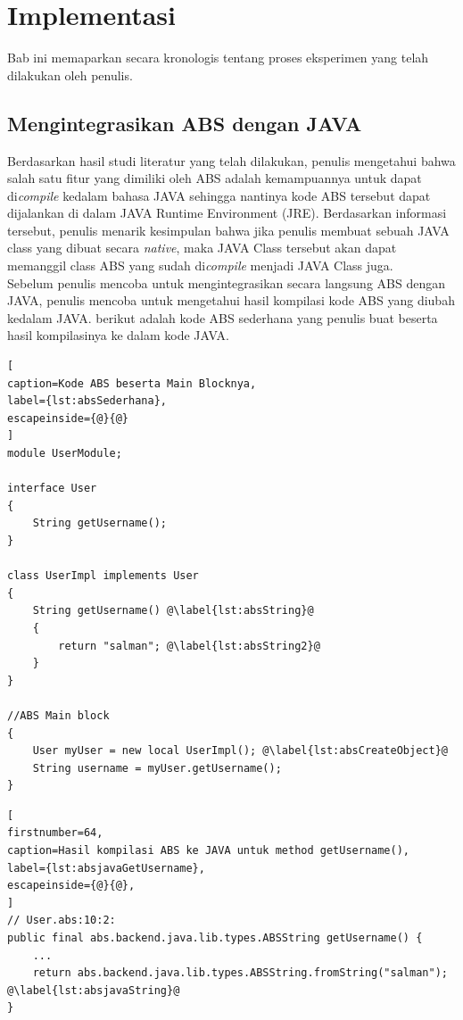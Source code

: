 \chapter{Implementasi}
Bab ini memaparkan secara kronologis tentang proses eksperimen yang telah dilakukan oleh penulis.

\section{Mengintegrasikan ABS dengan JAVA}
Berdasarkan hasil studi literatur yang telah dilakukan, penulis mengetahui bahwa salah satu fitur yang dimiliki oleh ABS adalah kemampuannya untuk dapat di\textit{compile} kedalam bahasa JAVA sehingga nantinya kode ABS tersebut dapat dijalankan di dalam JAVA Runtime Environment (JRE). Berdasarkan informasi tersebut, penulis menarik kesimpulan bahwa jika penulis membuat sebuah JAVA class yang dibuat secara \textit{native}, maka JAVA Class tersebut akan dapat memanggil class ABS yang sudah di\textit{compile} menjadi JAVA Class juga.\\

Sebelum penulis mencoba untuk mengintegrasikan secara langsung ABS dengan JAVA, penulis mencoba untuk mengetahui hasil kompilasi kode ABS yang diubah kedalam JAVA. berikut adalah kode ABS sederhana yang penulis buat beserta hasil kompilasinya ke dalam kode JAVA.

\begin{lstlisting}[
caption=Kode ABS beserta Main Blocknya,
label={lst:absSederhana},
escapeinside={@}{@}
]
module UserModule;

interface User
{
	String getUsername();
}

class UserImpl implements User
{
	String getUsername() @\label{lst:absString}@
	{
		return "salman"; @\label{lst:absString2}@
	}
}

//ABS Main block
{
	User myUser = new local UserImpl(); @\label{lst:absCreateObject}@
	String username = myUser.getUsername();
}
\end{lstlisting}

\begin{lstlisting}[ 
firstnumber=64,
caption=Hasil kompilasi ABS ke JAVA untuk method getUsername(),
label={lst:absjavaGetUsername},
escapeinside={@}{@},
]
// User.abs:10:2: 
public final abs.backend.java.lib.types.ABSString getUsername() {
    ...
    return abs.backend.java.lib.types.ABSString.fromString("salman"); @\label{lst:absjavaString}@
}
\end{lstlisting}

